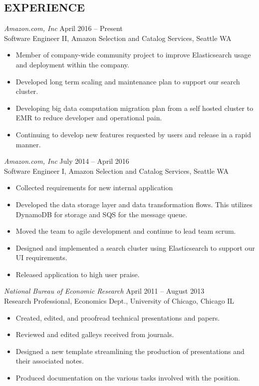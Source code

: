 \documentclass[line,margin]{res}
\begin{document}
\address{3040 17th Ave W, Unit 508, Seattle, WA 98119}
\address{(770) 833-3134\\ jake.whitaker@gmail.com}

\begin{resume}
  
  \section{EXPERIENCE}

  {\sl Amazon.com, Inc}
  \hfill April 2016 -- Present \\
  Software Engineer II, Amazon Selection and Catalog Services, Seattle WA
  \begin{itemize}  \itemsep-2pt
  \item Member of company-wide community project to improve Elasticsearch usage and deployment within the company.
  \item Developed long term scaling and maintenance plan to support our search cluster.
  \item Developing big data computation migration plan from a self hosted cluster to EMR to reduce developer and operational pain.
  \item Continuing to develop new features requested by users and release in a rapid manner.
  \end{itemize}
  
  {\sl Amazon.com, Inc}
  \hfill July 2014 -- April 2016 \\
  Software Engineer I, Amazon Selection and Catalog Services, Seattle WA
  \begin{itemize}  \itemsep-2pt
  \item Collected requirements for new internal application
  \item Developed the data storage layer and data transformation flows.  This utilizes DynamoDB for storage and SQS for the message queue.
  \item Moved the team to agile development and continue to lead team scrum.
  \item Designed and implemented a search cluster using Elasticsearch to support our UI requirements. 
  \item Released application to high user praise.
  \end{itemize}
  
  {\sl National Bureau of Economic Research}
  \hfill April 2011 -- August 2013 \\
  Research Professional, Economics Dept., University of Chicago, Chicago IL
  \begin{itemize}  \itemsep-2pt
  \item Created, edited, and proofread technical presentations and papers.
  \item Reviewed and edited galleys received from journals.
  \item Designed a new template streamlining the production of presentations and their associated notes.
  \item Produced documentation on the various tasks involved with the position.
  \end{itemize}
  

\end{resume}
\end{document}
